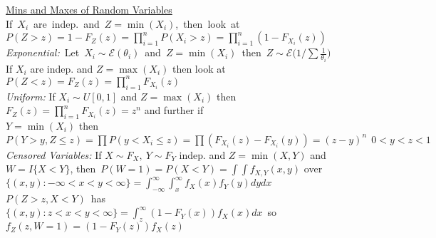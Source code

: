 \documentclass[11pt]{article}
\newcommand{\ExpDist}{\mathcal{E}}
\begin{document}
\indent\underline{Mins and Maxes of Random Variables}\\
\mbox{If $X_i$ are indep.\ and $Z=\min(X_i)$, then look at $P(Z>z) =
1-F_Z(z)=\prod_{i=1}^n P(X_i>z) = \prod_{i=1}^n (1-F_{X_i}(z))$}\\
\mbox{\hspace*{1.5em}\textsl{Exponential:}  Let $X_i\sim \ExpDist(\theta_i)$ and
$Z=\min(X_i)$  then $Z\sim \ExpDist \bigl(1/\sum \frac{1}{\theta_i}\bigr)$}\\
%
If $X_i$ are indep. and $Z=\max(X_i)$ then look at $P(Z<z)=F_Z(z) =
\prod_{i=1}^n F_{X_i}(z)$\\
%
\hspace*{1.5em}\textsl{Uniform:} If $X_i \sim U[0,1]$ and $Z=\max(X_i)$ then $F_Z(z) =
\prod_{i=1}^n F_{X_i}(z) = z^n$  and further if \\$Y=\min(X_i)$ then
\mbox{$P(Y>y,Z\leq z) = \prod P(y<X_i\leq z) =\prod (F_{X_i}(z) -F_{X_i}(y)) =
(z-y)^n\ \ 0<y<z<1$}
{\it Censored Variables:} If $X\sim F_X,\ Y\sim F_Y$ indep. and $Z=\min(X,Y)$ and
$W=I\{X<Y\}$, then\
$P(W=1) = P(X<Y) = \int\int f_{X,Y}(x,y)$ over $\{(x,y): -\infty <x<y<\infty\} =
\int_{-\infty}^\infty \int_x^\infty f_X(x)f_Y(y)dydx$\\
\mbox{{\footnotesize $P(Z>z, X<Y)$ has $\{(x,y):z<x<y<\infty\} = \int_z^\infty
(1-F_Y(x))f_X(x)dx$ so
$f_Z(z,W=1) = (1-F_Y(z))f_X(z)$}}
\end{document}
